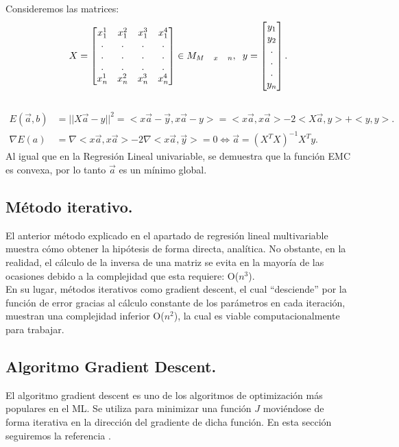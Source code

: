 \documentclass[a4paper,11pt]{article}
\begin{document}
\noindent
Consideremos las matrices:
\begin{equation}
X= \begin{bmatrix}
    x_{1}^1 & x_{1}^2 & x_{1}^3 & x_{1}^4  \\
    .&.&.&.\\
    .&.&.&.\\
    .&.&.&.\\
    x_{n}^1 & x_{n}^2 & x_{n}^3 & x_{n}^4 
\end{bmatrix} \in M_{M\quad x\quad  n}, \hspace{0.20cm} y=\begin{bmatrix}y_{1}\\y_{2}\\.\\.\\.\\y_{n}\end{bmatrix}.\end{equation} \\ \begin{align}E(\vec{a},b)&=||X\vec{a}-y||^2 = <x\vec{a}-\vec{y},x\vec{a}-y>=<x\vec{a},x\vec{a}>-2<X\vec{a},y>+<y,y>.\\
\nabla E(a)&=\nabla<x\vec{a},x\vec{a}>-2\nabla<x\vec{a},\vec{y}>=0\Leftrightarrow \boxed{ \vec{a}=(X^T X)^{-1} X^T y.}\end{align}
Al igual que en la Regresión Lineal univariable, se demuestra que la función EMC es convexa, por lo tanto $\vec{a}$ es un mínimo global.


\subsection{Método iterativo.}

El anterior método explicado en el apartado de regresión lineal multivariable muestra cómo obtener la hipótesis de forma directa, analítica. No obstante, en la realidad, el cálculo de la inversa de una matriz se evita en la mayoría de las ocasiones debido a la complejidad que esta requiere: O($n^3$).\\

\noindent
En su lugar, métodos iterativos como gradient descent, el cual “desciende” por la función de error gracias al cálculo constante de los parámetros en cada iteración, muestran una complejidad inferior O($n^2$), la cual es viable computacionalmente para trabajar. 

\subsection{Algoritmo Gradient Descent.}
El algoritmo gradient descent es uno de los algoritmos de optimización más populares en el ML. Se utiliza para minimizar una función $J$  moviéndose de forma iterativa en la dirección del gradiente de dicha función. En esta sección seguiremos la referencia \cite{granada}.\\
\end{document}
